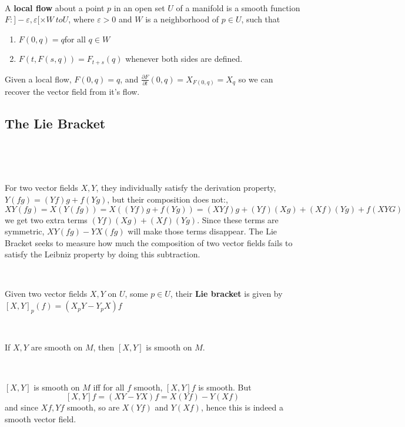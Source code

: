 \documentclass{article}
\begin{document}
\begin{definition}
  \

A \textbf{local flow} about a point $p$ in an open set $U$ of a manifold is a smooth function $F: ]-\varepsilon, \varepsilon[ \times W\ to U$, where $\varepsilon > 0$ and $W$ is a neighborhood of $p \in U$, such that
  \begin{enumerate}
    \item $F(0,q) = q$for all $q \in W$
    \item $F(t, F(s,q)) = F_{t+s}(q)$ whenever both sides are defined.
  \end{enumerate}

  Given a local flow, $F(0,q) = q$, and $\frac{\partial F}{\partial t}(0,q) = X_{F(0,q)} = X_q$ so we can recover the vector field from it's flow.
\end{definition}

\subsection{The Lie Bracket}
\

\begin{remark}[Motivation]
  \

  For two vector fields $X,Y$, they individually satisfy the derivation property, $Y(fg) = (Yf)g + f(Yg)$, but their composition does not:,$$XY(fg) = X(Y(fg)) = X((Yf)g + f(Yg)) = (XYf)g + (Yf)(Xg) + (Xf)(Yg) + f(XYG)$$we get two extra terms $(Yf)(Xg) + (Xf)(Yg)$. Since these terms are symmetric, $XY(fg) - YX(fg)$ will make those terms disappear. The Lie Bracket seeks to measure how much the composition of two vector fields fails to satisfy the Leibniz property by doing this subtraction.
\end{remark}

\begin{definition}
  \

  Given two vector fields $X,Y$ on $U$, some $p \in U$, their \textbf{Lie bracket} is given by $[X,Y]_p(f) = (X_pY - Y_pX)f$
\end{definition}

\begin{proposition}
  \

  If $X,Y$ are smooth on $M$, then $[X,Y]$ is smooth on $M$.
\end{proposition}

\begin{customproof}
  \

  $[X,Y]$ is smooth on $M$ iff for all $f$ smooth, $[X,Y]f$ is smooth. But $$[X,Y]f = (XY-YX)f = X(Yf) - Y(Xf)$$and since $Xf, Yf$ smooth, so are $X(Yf)$ and $Y(Xf)$, hence this is indeed a smooth vector field.
\end{customproof}
\end{document}
